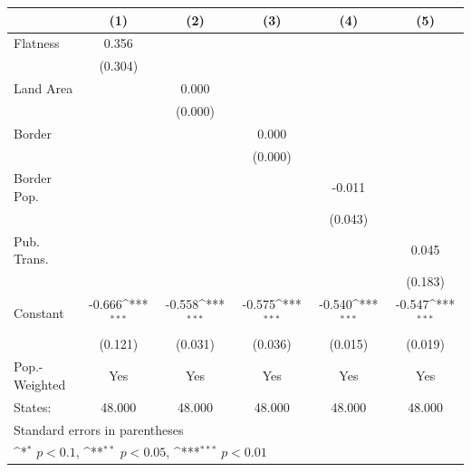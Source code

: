 {
\def\sym#1{\ifmmode^{#1}\else\(^{#1}\)\fi}
\begin{tabular}{l*{5}{c}}
\hline\hline
            &\multicolumn{1}{c}{(1)}         &\multicolumn{1}{c}{(2)}         &\multicolumn{1}{c}{(3)}         &\multicolumn{1}{c}{(4)}         &\multicolumn{1}{c}{(5)}         \\
\hline
Flatness    &       0.356         &                     &                     &                     &                     \\
            &     (0.304)         &                     &                     &                     &                     \\
[1em]
Land Area   &                     &       0.000         &                     &                     &                     \\
            &                     &     (0.000)         &                     &                     &                     \\
[1em]
Border      &                     &                     &       0.000         &                     &                     \\
            &                     &                     &     (0.000)         &                     &                     \\
[1em]
Border Pop. &                     &                     &                     &      -0.011         &                     \\
            &                     &                     &                     &     (0.043)         &                     \\
[1em]
Pub. Trans. &                     &                     &                     &                     &       0.045         \\
            &                     &                     &                     &                     &     (0.183)         \\
[1em]
Constant    &      -0.666\sym{***}&      -0.558\sym{***}&      -0.575\sym{***}&      -0.540\sym{***}&      -0.547\sym{***}\\
            &     (0.121)         &     (0.031)         &     (0.036)         &     (0.015)         &     (0.019)         \\
\hline
Pop.-Weighted&         Yes         &         Yes         &         Yes         &         Yes         &         Yes         \\
States:     &      48.000         &      48.000         &      48.000         &      48.000         &      48.000         \\
\hline\hline
\multicolumn{6}{l}{\footnotesize Standard errors in parentheses}\\
\multicolumn{6}{l}{\footnotesize \sym{*} \(p<0.1\), \sym{**} \(p<0.05\), \sym{***} \(p<0.01\)}\\
\end{tabular}
}
